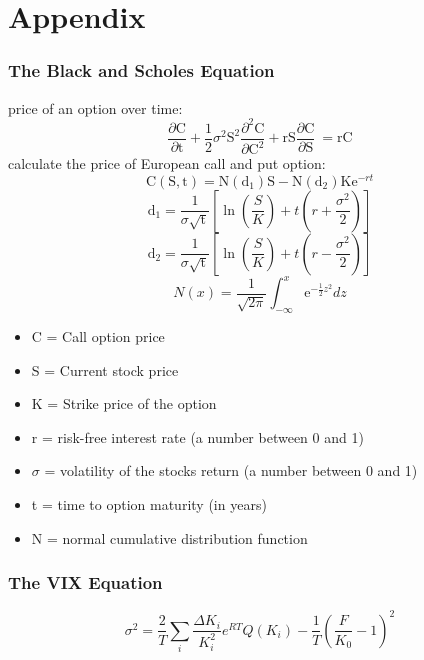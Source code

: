 \documentclass[aspectratio=169]{beamer}
\begin{document}
\section{Appendix}
\begin{frame}
\frametitle{The Black and Scholes Equation}
%
\begin{minipage}{0.6\textwidth}
\begin{small}
%
price of an option over time:
\begin{equation}
	\frac{\partial \mathrm C}{ \partial \mathrm t } + \frac{1}{2}\sigma^{2} \mathrm S^{2} \frac{\partial^{2} \mathrm C}{\partial \mathrm C^2}
	+ \mathrm r \mathrm S \frac{\partial \mathrm C}{\partial \mathrm S}\ =
	\mathrm r \mathrm C 
	\label{eq:1}
\end{equation}
%
calculate the price of European call and put option: 
\begin{equation}
	\mathrm C(\mathrm S,\mathrm t)= \mathrm N(\mathrm d_1)\mathrm S - \mathrm N(\mathrm d_2) \mathrm K \mathrm e^{-rt}
	\label{eq:2}
\end{equation}
\vspace{-3pt}
%
\begin{equation}
	\mathrm d_1= \frac{1}{\sigma \sqrt{\mathrm t}} \left[\ln{\left(\frac{S}{K}\right)} + t\left(r + \frac{\sigma^2}{2} \right) \right]
\end{equation}
\vspace{-3pt}
%
\begin{equation}
	\mathrm d_2= \frac{1}{\sigma \sqrt{\mathrm t}} \left[\ln{\left(\frac{S}{K}\right)} + t\left(r - \frac{\sigma^2}{2} \right) \right]
\end{equation}
\vspace{-3pt}
%
\begin{equation}
	N(x)=\frac{1}{\sqrt{2\pi}} \int_{-\infty}^{x} \mathrm e^{-\frac{1}{2}z^2} dz
	\label{eq:5}
\end{equation}
\end{small}
\end{minipage}
%
\begin{minipage}{0.35\textwidth}
\begin{footnotesize}
\begin{itemize}
	\item[] C = Call option price 
	\item[] S = Current stock price
	\item[] K = Strike price of the option
	\item[] r = risk-free interest rate (a number between 0 and 1)
	\item[] $\sigma$ = volatility of the stocks return (a number between 0 and 1)
	\item[] t = time to option maturity (in years)
	\item[] N = normal cumulative distribution function
\end{itemize}
\end{footnotesize}
\end{minipage}
%
\end{frame}

\begin{frame}
\frametitle{The VIX Equation}
	\begin{equation}
	\sigma^{2} = \frac{2}{T} \sum_{i} \frac{\Delta K_{i}}{K_{i}^{2}} e^{RT} Q(K_{i}) - \frac{1}{T} (\frac{F}{K_{0}} - 1)^{2}
	\end{equation}
\end{frame}
\end{document}
